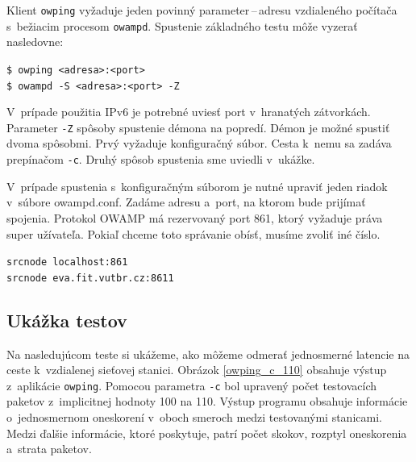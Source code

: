         \noindent Klient \texttt{owping} vyžaduje jeden povinný parameter\,--\,adresu
        vzdialeného počítača s~bežiacim procesom \texttt{owampd}.
        Spustenie základného testu môže vyzerať nasledovne:

        \begin{flushleft}
            \texttt{\$ owping <adresa>:<port>} \\
            \texttt{\$ owampd -S <adresa>:<port> -Z }
        \end{flushleft}

        V~prípade použitia IPv6 je potrebné uviesť port v~hranatých
        zátvorkách. Parameter \texttt{-Z} spôsoby spustenie démona na popredí.
        Démon je možné spustiť dvoma spôsobmi. Prvý vyžaduje konfiguračný súbor.
        Cesta k~nemu sa zadáva prepínačom \texttt{-c}. Druhý spôsob spustenia 
        sme uviedli v~ukážke.

        V~prípade spustenia s~konfiguračným súborom je nutné upraviť jeden
        riadok v~súbore owampd.conf. Zadáme adresu a~port, na ktorom bude prijímať
        spojenia. Protokol OWAMP má rezervovaný port 861,
        ktorý vyžaduje práva super užívateľa. Pokiaľ chceme toto správanie
        obísť, musíme zvoliť iné číslo.

        \begin{flushleft}
            \texttt{srcnode localhost:861} \\
            \texttt{srcnode eva.fit.vutbr.cz:8611}
        \end{flushleft}

        \subsection{Ukážka testov} \label{owamp_testy}
        Na nasledujúcom teste si ukážeme, ako môžeme odmerať jednosmerné 
        latencie na ceste k~vzdialenej sieťovej stanici.
        Obrázok \ref{owping_c_110} obsahuje výstup z~aplikácie \texttt{owping}. 
        Pomocou parametra \texttt{-c} bol upravený počet testovacích paketov
        z~implicitnej hodnoty 100 na 110.
        Výstup programu obsahuje informácie o~jednosmernom oneskorení v~oboch
        smeroch medzi testovanými stanicami. Medzi ďalšie informácie, ktoré
        poskytuje, patrí počet skokov, rozptyl oneskorenia a~strata paketov.

